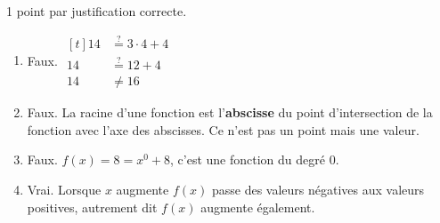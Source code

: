 %
%
    1 point par justification correcte.
    \begin{enumerate}
        \item Faux.
              $\begin{aligned}[t]
                      14 & \stackrel{?}{=} 3\cdot 4+ 4 \\
                      14 & \stackrel{?}{=} 12 + 4      \\
                      14 & \ne 16
                  \end{aligned}$
        \item Faux. La racine d'une fonction est l'\textbf{abscisse} du point d'intersection de la fonction avec l'axe des abscisses. Ce n'est pas un point mais une valeur.
        \item Faux. $f(x)= 8 = x^0 + 8$, c'est une fonction du degré 0.
        \item Vrai. Lorsque $x$ augmente $f(x)$ passe des valeurs négatives aux valeurs positives, autrement dit $f(x)$ augmente également.
    \end{enumerate}
